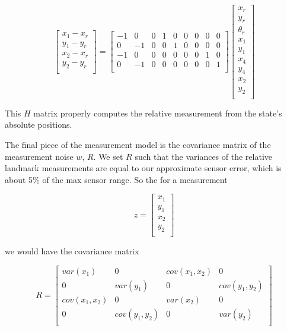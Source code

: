 \documentclass[prodmode,acmtecs]{acmsmall} %
\begin{document}
$$
\begin{bmatrix}
    x_1 - x_r \\
    y_1 - y_r \\
    x_2 - x_r \\
    y_2 - y_r \\
\end{bmatrix}
=
\begin{bmatrix}
    -1 & 0 & 0 & 1 & 0 & 0 & 0 & 0 & 0 \\
    0 & -1 & 0 & 0 & 1 & 0 & 0 & 0 & 0 \\
    -1 & 0 & 0 & 0 & 0 & 0 & 0 & 1 & 0 \\
    0 & -1 & 0 & 0 & 0 & 0 & 0 & 0 & 1 \\
\end{bmatrix}
\begin{bmatrix}
    x_r \\
    y_r \\
    \theta_r \\
    x_1 \\
    y_1 \\
    x_4 \\
    y_4 \\
    x_2 \\
    y_2 \\
\end{bmatrix}
$$

This $H$ matrix properly computes the relative measurement from the state's absolute positions.

The final piece of the measurement model is the covariance matrix of the measurement noise $w$, $R$. We set $R$ such that the variances of the relative landmark measurements are equal to our approximate sensor error, which is about 5\% of the max sensor range. So the for a measurement

$$
z
=
\begin{bmatrix}
    x_1 \\
    y_1 \\
    x_2 \\
    y_2 \\
\end{bmatrix}
$$

we would have the covariance matrix

$$
R
=
\begin{bmatrix}
    var(x_1)     & 0            & cov(x_1,x_2) & 0            \\
    0            & var(y_1)     & 0            & cov(y_1,y_2) \\
    cov(x_1,x_2) & 0            & var(x_2)     & 0            \\
    0            & cov(y_1,y_2) & 0            & var(y_2)     \\
\end{bmatrix}
$$
\end{document}
